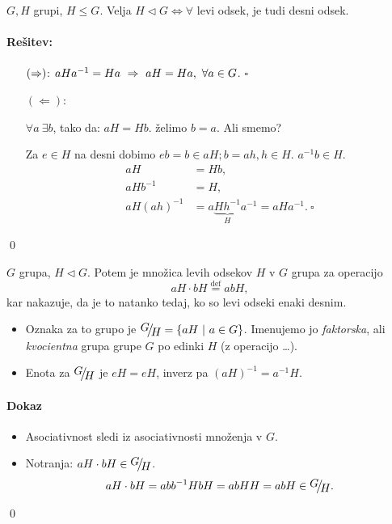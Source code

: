 \begin{zgled}
	$G, H$ grupi, $H \leq G$. Velja $H \lhd G \iff \forall$ levi odsek, je tudi desni odsek.
	\paragraph{Re\v sitev:}
	\begin{itemize}
		\item[$(\Rightarrow)$:]{$aHa^{-1} = Ha\ \Rightarrow\ aH = Ha,\ \forall a \in G$. $\square$}
		\item[$(\Leftarrow)$:]{$\forall a\ \exists b$, tako da: $aH = Hb$. \v zelimo $b = a$. Ali smemo?
		
		Za $e \in H$ na desni dobimo $eb = b \in aH; b = ah, h \in H$. $a^{-1}b \in H$.
		\begin{align*}
			aH &= Hb, \\
			aHb^{-1} &= H, \\
			aH (ah)^{-1} &= a\underbrace{Hh^{-1}}_{H}a^{-1} = aHa^{-1}.\ \square
		\end{align*}}
	\end{itemize}
\qed
\end{zgled}

\begin{trditev}
	$G$ grupa, $H \lhd G$. Potem je mno\v zica levih odsekov $H$ v $G$ grupa za operacijo
	\[
		aH \cdot bH \stackrel{\text{def}}{=} abH,
	\]
	kar nakazuje, da je to natanko tedaj, ko so levi odseki enaki desnim.
	\begin{itemize}
		\item{Oznaka za to grupo je $\quot{G}{H} = \{aH\ |\ a\in G\}$. Imenujemo jo \emph{faktorska}, ali
			\emph{kvocientna} grupa grupe $G$ po edinki $H$ (z operacijo \ldots).}
		\item{Enota za $\quot{G}{H}$ je $eH = eH$, inverz pa $(aH)^{-1} = a^{-1} H$.}
	\end{itemize}
\end{trditev}

\paragraph{Dokaz}
\begin{itemize}
	\item{Asociativnost sledi iz asociativnosti mno\v zenja v $G$.}
	\item{Notranja: $aH \cdot bH \in \quot{G}{H}$.
		\[
			aH \cdot bH = abb^{-1}HbH = ab HH = ab H \in \quot{G}{H}.
		\]}
\end{itemize}
\qed

